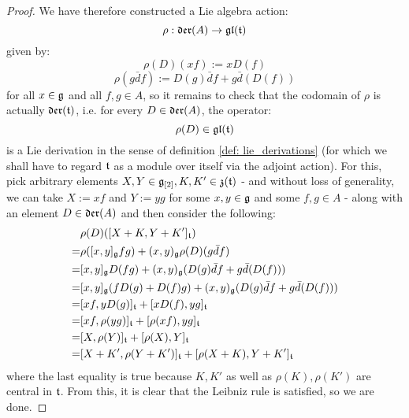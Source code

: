 \begin{proof}
                We have therefore constructed a Lie algebra action:
                    $$\rho: \mathfrak{der}(A) \to \mathfrak{gl}(\mathfrak{t})$$
                given by:
                    $$\rho(D)( xf ) := x D(f)$$
                    $$\rho( g\bar{d}f ) := D(g) \bar{d}f + g \bar{d}(D(f))$$
                for all $x \in \mathfrak{g}$ and all $f, g \in A$, so it remains to check that the codomain of $\rho$ is actually $\mathfrak{der}(\mathfrak{t})$, i.e. for every $D \in \mathfrak{der}(A)$, the operator:
                    $$\rho(D) \in \mathfrak{gl}(\mathfrak{t})$$
                is a Lie derivation in the sense of definition \ref{def: lie_derivations} (for which we shall have to regard $\mathfrak{t}$ as a module over itself via the adjoint action). For this, pick arbitrary elements $X, Y \in \mathfrak{g}_{[2]}, K, K' \in \mathfrak{z}(\mathfrak{t})$ - and without loss of generality, we can take $X := xf$ and $Y := yg$ for some $x, y \in \mathfrak{g}$ and some $f, g \in A$ - along with an element $D \in \mathfrak{der}(A)$ and then consider the following:
                    $$
                        \begin{aligned}
                            & \rho(D)( [X + K, Y + K']_{\mathfrak{t}} )
                            \\
                            = & \rho([x, y]_{\mathfrak{g}} fg) + (x, y)_{\mathfrak{g}} \rho(D)(g \bar{d}f)
                            \\
                            = & [x, y]_{\mathfrak{g}} D(fg) + (x, y)_{\mathfrak{g}} ( D(g) \bar{d}f + g \bar{d}(D(f)) )
                            \\
                            = & [x, y]_{\mathfrak{g}} ( f D(g) + D(f) g ) + (x, y)_{\mathfrak{g}} ( D(g) \bar{d}f + g \bar{d}(D(f)) )
                            \\
                            = & [ xf, y D(g) ]_{\mathfrak{t}} + [ x D(f), yg ]_{\mathfrak{t}}
                            \\
                            = &  [ xf, \rho(yg) ]_{\mathfrak{t}} + [ \rho(xf), yg ]_{\mathfrak{t}}
                            \\
                            = & [ X, \rho(Y) ]_{\mathfrak{t}} + [ \rho(X), Y ]_{\mathfrak{t}}
                            \\
                            = & [ X + K', \rho(Y + K') ]_{\mathfrak{t}} + [ \rho(X + K), Y + K' ]_{\mathfrak{t}}
                        \end{aligned}
                    $$
                where the last equality is true because $K, K'$ as well as $\rho(K), \rho(K')$ are central in $\mathfrak{t}$. From this, it is clear that the Leibniz rule is satisfied, so we are done.
            \end{proof}
